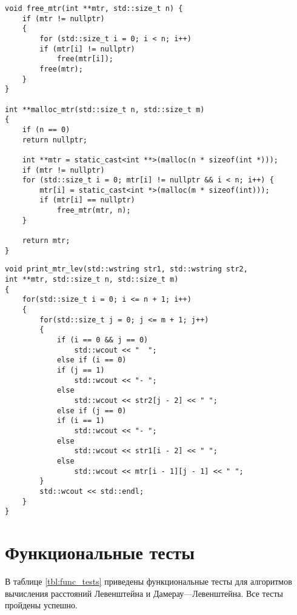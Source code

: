 \begin{lstlisting}[label=lst:allocate_mtr,caption=Функции динамического выделения и очищения памяти под матрицу]
void free_mtr(int **mtr, std::size_t n) {
	if (mtr != nullptr)
	{
		for (std::size_t i = 0; i < n; i++)
		if (mtr[i] != nullptr)
			free(mtr[i]);
		free(mtr);
	}
}

int **malloc_mtr(std::size_t n, std::size_t m)
{
	if (n == 0)
	return nullptr;
	
	int **mtr = static_cast<int **>(malloc(n * sizeof(int *)));
	if (mtr != nullptr)
	for (std::size_t i = 0; mtr[i] != nullptr && i < n; i++) {
		mtr[i] = static_cast<int *>(malloc(m * sizeof(int)));
		if (mtr[i] == nullptr)
			free_mtr(mtr, n);
	}
	
	return mtr;
}
\end{lstlisting}

\clearpage

\begin{lstlisting}[label=lst:print_mtr,caption=Функции вывода матрицы для алгоритмов поиска расстояния Левенштейна и Дамерау-Левенштейна]
void print_mtr_lev(std::wstring str1, std::wstring str2,
int **mtr, std::size_t n, std::size_t m)
{
	for(std::size_t i = 0; i <= n + 1; i++)
	{
		for(std::size_t j = 0; j <= m + 1; j++)
		{
			if (i == 0 && j == 0)
				std::wcout << "  ";
			else if (i == 0)
			if (j == 1)
				std::wcout << "- ";
			else
				std::wcout << str2[j - 2] << " ";
			else if (j == 0)
			if (i == 1)
				std::wcout << "- ";
			else
				std::wcout << str1[i - 2] << " ";
			else
				std::wcout << mtr[i - 1][j - 1] << " ";
		}
		std::wcout << std::endl;
	}
}
\end{lstlisting}

\clearpage

\section{Функциональные тесты}

В таблице \ref{tbl:func_tests} приведены функциональные тесты для алгоритмов вычисления расстояний Левенштейна и Дамерау—Левенштейна. Все тесты пройдены успешно.

